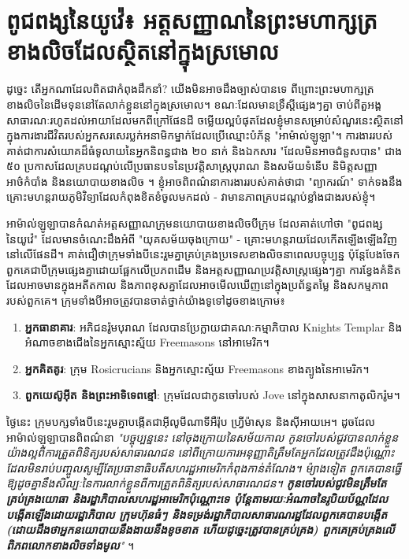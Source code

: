 \documentclass[10pt,twocolumn,letterpaper]{article}
\begin{document}
\section{ពូជពង្សនៃយូវ៉េ៖ អត្តសញ្ញាណនៃព្រះមហាក្សត្រខាងលិចដែលស្ថិតនៅក្នុងស្រមោល}

ដូច្នេះ តើអ្នកណាដែលពិតជាកំពុងដឹកនាំ? យើងមិនអាចដឹងច្បាស់បានទេ ពីព្រោះព្រះមហាក្សត្រខាងលិចនៃដើមទុននៅតែលាក់ខ្លួននៅក្នុងស្រមោល។ ខណៈដែលមានទ្រឹស្ដីផ្សេងៗគ្នា ចាប់ពីតួអង្គសាធារណៈរហូតដល់អាយាដែលមកពីក្រៅផែនដី ចម្លើយល្អបំផុតដែលខ្ញុំមានសម្រាប់សំណួរនេះស្ថិតនៅក្នុងការងារជីវិតរបស់អ្នកសរសេរប្លក់អនាមិកម្នាក់ដែលប្រើឈ្មោះបំភ័ន្ត "អាម៉ាល់ឡូឡា"។ ការងាររបស់គាត់ជាការសំយោគដ៏ធំទូលាយនៃអ្នកនិពន្ធជាង ២០ នាក់ និងឯកសារ "ដែលមិនអាចជំនួសបាន" ជាង ៥០ ប្រកាសដែលគ្របដណ្ដប់លើប្រធានបទនៃប្រវត្តិសាស្ត្របុរាណ និងសម័យទំនើប និមិត្តសញ្ញាអាថ៌កំបាំង និងនយោបាយខាងលិច \cite{33,34}។ ខ្ញុំអាចពិពណ៌នាការងាររបស់គាត់ថាជា "ព្យាករណ៍" ទាក់ទងនឹងគ្រោះមហន្តរាយភូមិវិទ្យាដែលកំពុងខិតខំចូលមកដល់ - វាមានភាពគ្របដណ្ដប់ខ្លាំងជាងរបស់ខ្ញុំ។

អាម៉ាល់ឡូឡាបានកំណត់អត្តសញ្ញាណក្រុមនយោបាយខាងលិចបីក្រុម ដែលគាត់ហៅថា "ពូជពង្សនៃយូវ៉េ" ដែលមានចំណេះដឹងអំពី "យុគសម័យចុងក្រោយ" - គ្រោះមហន្តរាយដែលកើតឡើងឡើងវិញនៅលើផែនដី។ គាត់ជឿថាក្រុមទាំងបីនេះរួមគ្នាគ្រប់គ្រងប្រទេសខាងលិចនាពេលបច្ចុប្បន្ន ប៉ុន្តែបែងចែកពួកគេជាបីក្រុមផ្សេងគ្នាដោយផ្អែកលើប្រភពដើម និងអត្តសញ្ញាណប្រវត្តិសាស្ត្រផ្សេងៗគ្នា ការខ្វែងគំនិតដែលអាចមានក្នុងអតីតកាល និងភាពខុសគ្នាដែលអាចមើលឃើញនៅក្នុងប្រព័ន្ធតម្លៃ និងសកម្មភាពរបស់ពួកគេ។
ក្រុមទាំងបីអាចត្រូវបានចាត់ថ្នាក់យ៉ាងទូទៅដូចខាងក្រោម៖

\begin{flushleft}
\begin{enumerate}
    \item \textbf{អ្នកធានាគារ}: អភិជនរ៉ូមបុរាណ ដែលបានប្រែក្លាយជាគណៈកម្មាភិបាល Knights Templar និងអំណាចខាងជើងនៃអ្នកស្មោះស្ម័យ Freemasons នៅអាមេរិក។
    \item \textbf{អ្នកគិតគូរ}: ក្រុម Rosicrucians និងអ្នកស្មោះស្ម័យ Freemasons ខាងត្បូងនៃអាមេរិក។
    \item \textbf{ពួកយេស៊ូអ៊ីត និងព្រះអាទិទេពខ្មៅ}: ក្រុមដែលជាកូនចៅរបស់ Jove នៅក្នុងសាសនាកាតូលិករ៉ូម។
\end{enumerate}
\end{flushleft}
ថ្ងៃនេះ ក្រុមបក្សទាំងបីនេះរួមគ្នាបង្កើតជាអ៊ីលូមីណាទីអឺរ៉ុប ហ្វ្រីម៉ាសុន និងស៊ីអាយអេ។ ដូចដែលអាម៉ាល់ឡុឡាបានពិពណ៌នា \textit{"បច្ចុប្បន្ននេះ នៅចុងក្រោយនៃសម័យកាល កូនចៅរបស់ជូវបានលាក់ខ្លួនយ៉ាងល្អពីការត្រួតពិនិត្យរបស់សាធារណជន នៅពីក្រោយការអនុញ្ញាតិត្រឹមតែអ្នកដែលត្រូវដឹងប៉ុណ្ណោះ ដែលមិនរាប់បញ្ចូលសូម្បីតែប្រធានាធិបតីសហរដ្ឋអាមេរិកកំពុងកាន់តំណែង។ ម៉្យាងទៀត ពួកគេបានធ្វើឱ្យដូចគ្នានឹងសិល្បៈនៃការលាក់ខ្លួនពីការត្រួតពិនិត្យរបស់សាធារណជន។ \textbf{កូនចៅរបស់ជូវមិនត្រឹមតែគ្រប់គ្រងយោធា និងរដ្ឋាភិបាលសហរដ្ឋអាមេរិកប៉ុណ្ណោះទេ ប៉ុន្តែតាមរយៈអំណាចនៃរូបិយប័ណ្ណដែលបង្កើតឡើងដោយរដ្ឋាភិបាល ក្រុមហ៊ុនធំៗ និងទម្រង់រដ្ឋាភិបាលសាធារណរដ្ឋដែលពួកគេបានបង្កើត (ដោយដឹងថាអ្នកនយោបាយនឹងងាយនឹងខូចខាត ហើយដូច្នេះត្រូវបានគ្រប់គ្រង) ពួកគេគ្រប់គ្រងលើពិភពលោកខាងលិចទាំងមូល}"} \cite{33,34}។
\end{document}
